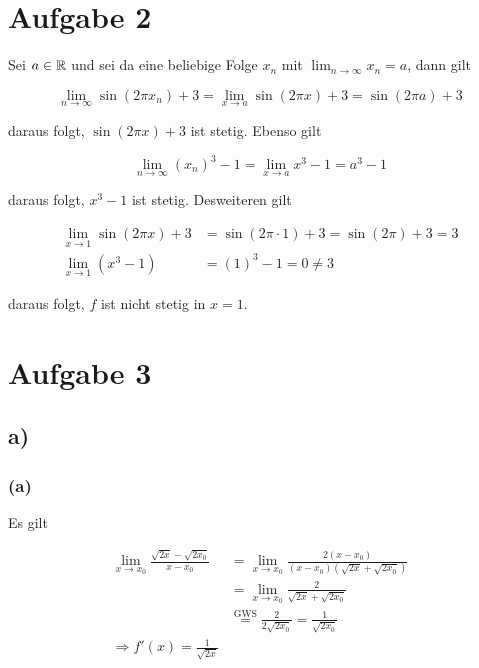 \documentclass[a4paper, 11pt]{article}
\begin{document}
\section{Aufgabe 2}
\label{sec:org5ba0724}
Sei \(a \in \mathbb{R}\) und sei da eine beliebige Folge \(x_n\) mit
\(\lim_{n \rightarrow \infty} x_n = a\), dann gilt

$$ \lim_{n \rightarrow \infty} \sin(2\pi x_n) + 3 =
    \lim_{x \rightarrow a} \sin(2\pi x) + 3 = \sin(2\pi a) + 3 $$

daraus folgt, \(\sin(2\pi x) + 3\) ist stetig. \newline
Ebenso gilt

$$ \lim_{n \rightarrow \infty} (x_n)^3 - 1 =
    \lim_{x \rightarrow a} x^3 - 1 = a^3 - 1 $$

daraus folgt, \(x^3 - 1\) ist stetig. \newline
Desweiteren gilt

\begin{align*}
    \lim_{x \rightarrow 1} \sin(2\pi x) + 3 &= \sin(2\pi \cdot 1) + 3 =
        \sin(2\pi) + 3 = 3 \\
    \lim_{x \rightarrow 1} (x^3 - 1) &= (1)^3 - 1 = 0 \neq 3
\end{align*}

daraus folgt, \(f\) ist nicht stetig in \(x = 1\).

\section{Aufgabe 3}
\label{sec:orge2279a6}
\subsection{a)}
\label{sec:orgfd9a5d8}
\subsubsection{(a)}
\label{sec:org054ae2b}
Es gilt

\begin{align*}
    \lim_{x \rightarrow x_0} \frac{\sqrt{2x} - \sqrt{2x_0}}{x - x_0} &=
        \lim_{x \rightarrow x_0}
            \frac{2(x - x_0)}{(x - x_0)(\sqrt{2x} + \sqrt{2x_0})} \\
    &= \lim_{x \rightarrow x_0} \frac{2}{\sqrt{2x} + \sqrt{2x_0}} \\
    & \overset{\text{GWS}}{=}
        \frac{2}{2 \sqrt{2x_0}} = \frac{1}{\sqrt{2x_0}} \\
    \Rightarrow f'(x) = \frac{1}{\sqrt{2x}}
\end{align*}
\end{document}
